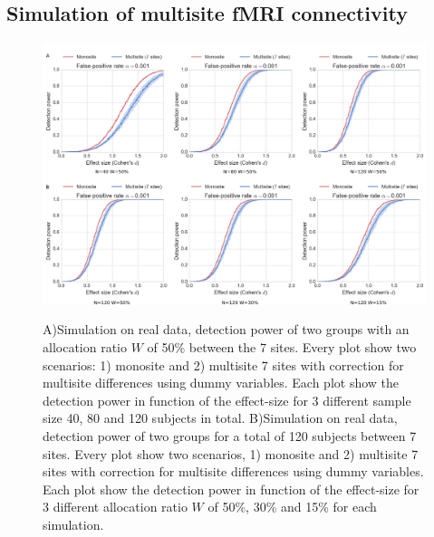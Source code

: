 \documentclass[authoryear]{elsarticle}
\begin{document}
\subsection{Simulation of multisite fMRI connectivity}

\begin{figure}[tbp]
\centering
\captionsetup[subfloat]{labelformat=empty}
{\includegraphics[width=\textwidth]{../figures/simulations_real_7sites.png}}

\caption{
A)Simulation on real data, detection power of two groups with an allocation ratio $W$ of 50\% between the 7 sites. Every plot show two scenarios: 1) monosite and 2) multisite 7 sites with correction for multisite differences using dummy variables. Each plot show the detection power in function of the effect-size for 3 different sample size 40, 80 and 120 subjects in total.
B)Simulation on real data, detection power of two groups for a total of 120 subjects between 7 sites. Every plot show two scenarios, 1) monosite and 2) multisite 7 sites with correction for multisite differences using dummy variables. Each plot show the detection power in function of the effect-size for 3 different allocation ratio $W$ of 50\%, 30\% and 15\% for each simulation.
}
\label{fig_real_sim}
\end{figure}
\end{document}
